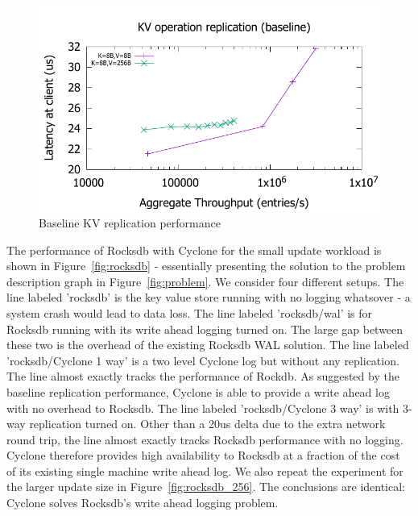 \documentclass[pageno]{jpaper}
\begin{document}
\begin{figure}
\includegraphics[scale=0.6]{results2/kv_baseline.pdf}
\caption{Baseline KV replication performance}
\label{fig:kv_baseline}
\end{figure}

The performance of Rocksdb with Cyclone for the small update workload is shown
in Figure~\ref{fig:rocksdb} - essentially presenting the solution to the problem
description graph in Figure~\ref{fig:problem}.  We consider four different
setups. The line labeled 'rocksdb' is the key value store running with no
logging whatsover - a system crash would lead to data loss. The line labeled
'rocksdb/wal' is for Rocksdb running with its write ahead logging turned on. The
large gap between these two is the overhead of the existing Rocksdb WAL
solution. The line labeled 'rocksdb/Cyclone 1 way' is a two level Cyclone log
but without any replication. The line almost exactly tracks the performance of
Rockdb. As suggested by the baseline replication performance, Cyclone is able to
provide a write ahead log with no overhead to Rocksdb. The line labeled
'rocksdb/Cyclone 3 way' is with 3-way replication turned on. Other than a 20us
delta due to the extra network round trip, the line almost exactly tracks
Rocksdb performance with no logging. Cyclone therefore provides high
availability to Rocksdb at a fraction of the cost of its existing single machine
write ahead log. We also repeat the experiment for the larger update size in
Figure~\ref{fig:rocksdb_256}. The conclusions are identical: Cyclone solves
Rocksdb's write ahead logging problem.
\end{document}

